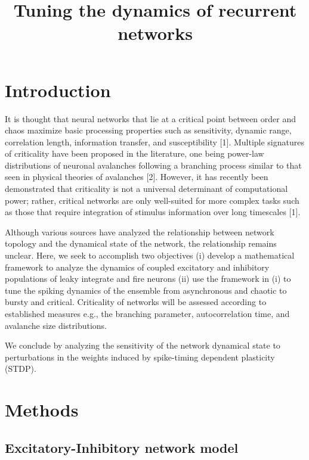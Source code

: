 \documentclass{article} %
\title{Tuning the dynamics of recurrent networks}
\begin{document}
\maketitle

\begin{abstract}
\end{abstract}


\section{Introduction}

It is thought that neural networks that lie at a critical point between order and chaos maximize basic processing properties such as sensitivity, dynamic range, correlation length, information transfer, and susceptibility [1]. Multiple signatures of criticality have been proposed in the literature, one being power-law distributions of neuronal avalanches following a branching process similar to that seen in physical theories of avalanches [2]. However, it has recently been demonstrated that criticality is not a universal determinant of computational power; rather, critical networks are only well-suited for more complex tasks such as those that require integration of stimulus information over long timescales [1]. 

Although various sources have analyzed the relationship between network topology and the dynamical state of the network, the relationship remains unclear. Here, we seek to accomplish two objectives (i) develop a mathematical framework to analyze the dynamics of coupled excitatory and inhibitory populations of leaky integrate and fire neurons (ii) use the framework in (i) to tune the spiking dynamics of the ensemble from asynchronous and chaotic to bursty and critical. Criticality of networks will be assessed according to established measures e.g., the branching parameter, autocorrelation time, and avalanche size distributions. 

We conclude by analyzing the sensitivity of the network dynamical state to perturbations in the weights induced by spike-timing dependent plasticity (STDP).

\section{Methods}


\subsection{Excitatory-Inhibitory network model}
\end{document}
